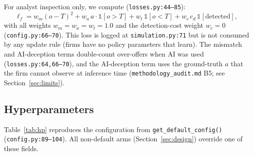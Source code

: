 \documentclass[11pt]{article}
\begin{document}
For analyst inspection only, we compute (\texttt{losses.py:44--85}):
\begin{equation}
  \ell_{f} = w_{m}(o-T)^{2}
       + w_{a}\, a\cdot \mathbb{1}[o>T]
       + w_{t}\, \mathbb{1}[o<T]
       + w_{c}\, c_{d}\, \mathbb{1}[\text{detected}],
\end{equation}
with all weights \(w_{m}{=}w_{a}{=}w_{t}{=}1.0\) and the detection-cost
weight \(w_{c}=0\) (\texttt{config.py:66--70}).
This loss is logged at \texttt{simulation.py:71} but is not consumed by any
update rule (firms have no policy parameters that learn). The mismatch and
AI-deception terms double-count over-offers when AI was used
(\texttt{losses.py:64,66--70}), and the AI-deception term uses the ground-truth
\(a\) that the firm cannot observe at inference time
(\texttt{methodology\_audit.md} B5; see Section~\ref{sec:limits}).

\subsection{Hyperparameters}

Table~\ref{tab:hp} reproduces the configuration from
\texttt{get\_default\_config()} (\texttt{config.py:89--104}). All non-default
arms (Section~\ref{sec:design}) override one of these fields.
\end{document}
